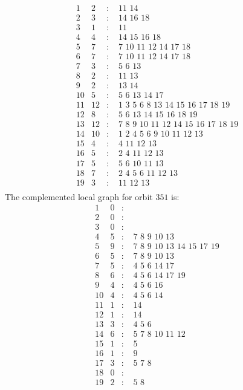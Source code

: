\documentclass[12pt]{article}
\begin{document}
\begin{equation*}
\begin{array}{rrcl}
1&2&:&\,\,11\,\,14\\
2&3&:&\,\,14\,\,16\,\,18\\
3&1&:&\,\,11\\
4&4&:&\,\,14\,\,15\,\,16\,\,18\\
5&7&:&\,\,7\,\,10\,\,11\,\,12\,\,14\,\,17\,\,18\\
6&7&:&\,\,7\,\,10\,\,11\,\,12\,\,14\,\,17\,\,18\\
7&3&:&\,\,5\,\,6\,\,13\\
8&2&:&\,\,11\,\,13\\
9&2&:&\,\,13\,\,14\\
10&5&:&\,\,5\,\,6\,\,13\,\,14\,\,17\\
11&12&:&\,\,1\,\,3\,\,5\,\,6\,\,8\,\,13\,\,14\,\,15\,\,16\,\,17\,\,18\,\,19\\
12&8&:&\,\,5\,\,6\,\,13\,\,14\,\,15\,\,16\,\,18\,\,19\\
13&12&:&\,\,7\,\,8\,\,9\,\,10\,\,11\,\,12\,\,14\,\,15\,\,16\,\,17\,\,18\,\,19\\
14&10&:&\,\,1\,\,2\,\,4\,\,5\,\,6\,\,9\,\,10\,\,11\,\,12\,\,13\\
15&4&:&\,\,4\,\,11\,\,12\,\,13\\
16&5&:&\,\,2\,\,4\,\,11\,\,12\,\,13\\
17&5&:&\,\,5\,\,6\,\,10\,\,11\,\,13\\
18&7&:&\,\,2\,\,4\,\,5\,\,6\,\,11\,\,12\,\,13\\
19&3&:&\,\,11\,\,12\,\,13\\
\end{array}
\end{equation*}
The complemented local graph for orbit $351$ is:
\begin{equation*}
\begin{array}{rrcl}
1&0&:&\\
2&0&:&\\
3&0&:&\\
4&5&:&\,\,7\,\,8\,\,9\,\,10\,\,13\\
5&9&:&\,\,7\,\,8\,\,9\,\,10\,\,13\,\,14\,\,15\,\,17\,\,19\\
6&5&:&\,\,7\,\,8\,\,9\,\,10\,\,13\\
7&5&:&\,\,4\,\,5\,\,6\,\,14\,\,17\\
8&6&:&\,\,4\,\,5\,\,6\,\,14\,\,17\,\,19\\
9&4&:&\,\,4\,\,5\,\,6\,\,16\\
10&4&:&\,\,4\,\,5\,\,6\,\,14\\
11&1&:&\,\,14\\
12&1&:&\,\,14\\
13&3&:&\,\,4\,\,5\,\,6\\
14&6&:&\,\,5\,\,7\,\,8\,\,10\,\,11\,\,12\\
15&1&:&\,\,5\\
16&1&:&\,\,9\\
17&3&:&\,\,5\,\,7\,\,8\\
18&0&:&\\
19&2&:&\,\,5\,\,8\\
\end{array}
\end{equation*}
\end{document}
